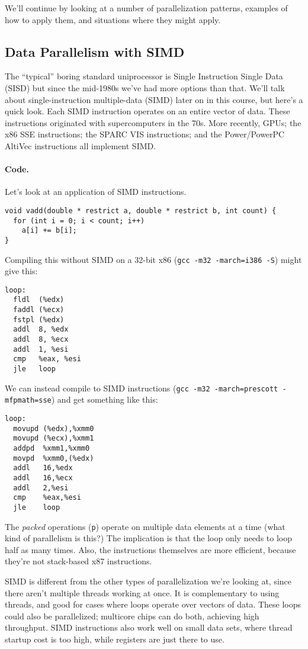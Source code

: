 We'll continue by looking at a number of parallelization patterns,
examples of how to apply them, and situations where they might apply.

\subsection*{Data Parallelism with SIMD}
The ``typical'' boring standard uniprocessor is Single Instruction Single Data (SISD) but since the mid-1980s we've had more options than that. We'll talk about single-instruction multiple-data (SIMD) later on in
this course, but here's a quick look. Each SIMD
instruction operates on an entire vector of data. These instructions
originated with supercomputers in the 70s. More recently, GPUs; the
x86 SSE instructions; the SPARC VIS instructions; and the
Power/PowerPC AltiVec instructions all implement SIMD.

\paragraph{Code.} Let's look at an application of SIMD instructions.

\begin{verbatim}
void vadd(double * restrict a, double * restrict b, int count) {
  for (int i = 0; i < count; i++)
    a[i] += b[i];
}
\end{verbatim}

Compiling this without SIMD on a 32-bit x86 ({\tt gcc -m32 -march=i386 -S}) might give this:
\begin{verbatim}
loop:
  fldl  (%edx)
  faddl (%ecx)
  fstpl (%edx)
  addl  8, %edx
  addl  8, %ecx
  addl  1, %esi
  cmp   %eax, %esi
  jle   loop
\end{verbatim}

We can instead compile to SIMD instructions ({\tt gcc -m32 -march=prescott -mfpmath=sse})
and get something like this:
\begin{verbatim}
loop:
  movupd (%edx),%xmm0
  movupd (%ecx),%xmm1
  addpd  %xmm1,%xmm0
  movpd  %xmm0,(%edx)
  addl   16,%edx
  addl   16,%ecx
  addl   2,%esi
  cmp    %eax,%esi
  jle    loop
\end{verbatim}
The \emph{packed} operations ({\tt p}) operate on multiple data
elements at a time (what kind of parallelism is this?)
The implication is that the loop only needs to loop half as many times.
Also, the instructions themselves are more efficient, because they're
not stack-based x87 instructions.

SIMD is different from the other types of parallelization we're
looking at, since there aren't multiple threads working at once.
It is complementary to using threads, and good for cases
where loops operate over vectors of data. These loops could also be
parallelized; multicore chips can do both, achieving high throughput.
SIMD instructions also work well on small data sets, where thread startup
cost is too high, while registers are just there to use.

